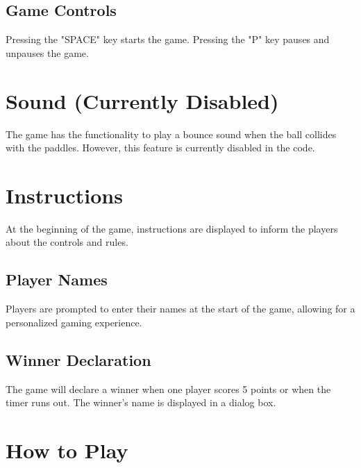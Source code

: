 \documentclass[16pt]{article}
\begin{document}
\subsection*{Game Controls}
\begin{flushleft}
\Large Pressing the "SPACE" key starts the game.
\Large Pressing the "P" key pauses and unpauses the game.
\end{flushleft}

\section*{Sound (Currently Disabled)}
\begin{flushleft}
\Large The game has the functionality to play a bounce sound when the ball collides with the paddles. However, this feature is currently disabled in the code.
\end{flushleft}

\section*{Instructions}
\begin{flushleft}
\Large At the beginning of the game, instructions are displayed to inform the players about the controls and rules.
\end{flushleft}

\subsection*{Player Names}
\begin{flushleft}
\Large Players are prompted to enter their names at the start of the game, allowing for a personalized gaming experience.
\end{flushleft}

\subsection*{Winner Declaration}
\begin{flushleft}
\Large The game will declare a winner when one player scores 5 points or when the timer runs \Large out. The winner's name is displayed in a dialog box.
\end{flushleft}



\section*{How to Play}
\end{document}
